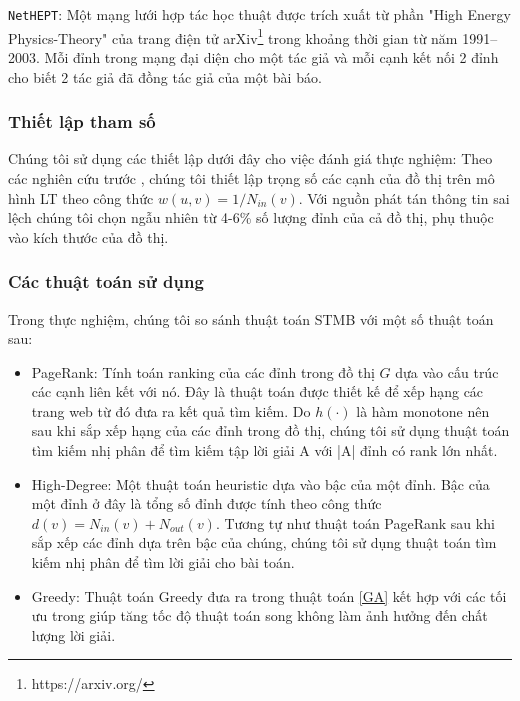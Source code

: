 \texttt{NetHEPT}\cite{kemple1, chen10LT}: Một mạng lưới hợp tác học thuật được trích xuất từ phần "High Energy Physics-Theory" của trang điện tử arXiv\footnote{https://arxiv.org/} trong khoảng thời gian từ năm 1991--2003. Mỗi đỉnh trong mạng đại diện cho một tác giả và mỗi cạnh kết nối 2 đỉnh cho biết 2 tác giả đã đồng tác giả của một bài báo.

\subsubsection{Thiết lập tham số}
Chúng tôi sử dụng các thiết lập dưới đây cho việc đánh giá thực nghiệm:
Theo các nghiên cứu trước \cite{khali, kemple1,chen10LT}, chúng tôi thiết lập trọng số các cạnh của đồ thị trên mô hình LT theo công thức $w(u,v) = 1/N_{in}(v)$. Với nguồn phát tán thông tin sai lệch chúng tôi chọn ngẫu nhiên từ 4-6\% số lượng đỉnh của cả đồ thị, phụ thuộc vào kích thước của đồ thị. 


\subsubsection{Các thuật toán sử dụng}
Trong thực nghiệm, chúng tôi so sánh thuật toán STMB với một số thuật toán sau:
\begin {itemize}
\item PageRank: Tính toán ranking của các đỉnh trong đồ thị $G$ dựa vào cấu trúc các cạnh liên kết với nó. Đây là thuật toán được thiết kế để xếp hạng các trang web từ đó đưa ra kết quả tìm kiếm. Do $h(\cdot)$ là hàm monotone nên sau khi sắp xếp hạng của các đỉnh trong đồ thị, chúng tôi sử dụng thuật toán tìm kiếm nhị phân để tìm kiếm tập lời giải A với |A| đỉnh có rank lớn nhất.
\item High-Degree: Một thuật toán heuristic dựa vào bậc của một đỉnh. Bậc của một đỉnh ở đây là tổng số đỉnh được tính theo công thức $d(v) = N_{in}(v) + N_{out}(v)$. Tương tự như thuật toán PageRank sau khi sắp xếp các đỉnh dựa trên bậc của chúng, chúng tôi sử dụng thuật toán tìm kiếm nhị phân để tìm lời giải cho bài toán.
\item Greedy: Thuật toán Greedy đưa ra trong thuật toán \ref{GA} kết hợp với các tối ưu trong \cite{Jleskovec} giúp tăng tốc độ thuật toán song không làm ảnh hưởng đến chất lượng lời giải.
\end{itemize} 

